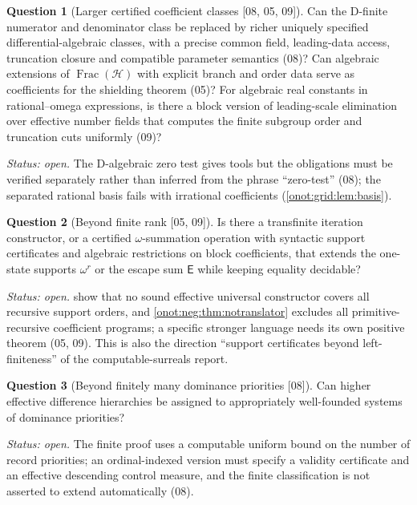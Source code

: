 \documentclass[11pt,oneside]{article}
\numberwithin{equation}{section}
\theoremstyle{definition}
\newtheorem{question}[question]{Question}
\theoremstyle{remark}
\newcommand{\FH}{\operatorname{Frac}(\mathcal H)}
\newcommand{\src}[1]{\textup{\textsf{\small[#1]}}}
\begin{document}
\begin{question}[Larger certified coefficient classes \src{08, 05, 09}]\label{onot:q:coefficients}
Can the D-finite numerator and denominator class be replaced by richer uniquely
specified differential-algebraic classes, with a precise common field, leading-data
access, truncation closure and compatible parameter semantics (08)? Can algebraic
extensions of $\FH$ with explicit branch and order data serve as coefficients for
the shielding theorem (05)? For algebraic real constants in rational--omega
expressions, is there a block version of leading-scale elimination over effective
number fields that computes the finite subgroup order and truncation cuts uniformly
(09)?
\end{question}
\emph{Status: open.} The D-algebraic zero test \cite{CFH} gives tools but the
obligations must be verified separately rather than inferred from the phrase
``zero-test'' (08); the separated rational basis fails with irrational coefficients
(\cref{onot:grid:lem:basis}).

\begin{question}[Beyond finite rank \src{05, 09}]\label{onot:q:beyond}
Is there a transfinite iteration constructor, or a certified $\omega$-summation
operation with syntactic support certificates and algebraic restrictions on block
coefficients, that extends the one-state supports $\omega^r$ or the escape sum
$\mathsf E$ while keeping equality decidable?
\end{question}
\emph{Status: open.}  show that no
sound effective universal constructor covers all recursive support orders, and
\cref{onot:neg:thm:notranslator} excludes all primitive-recursive coefficient
programs; a specific stronger language needs its own positive theorem (05, 09).
This is also the direction ``support certificates beyond left-finiteness'' of the
computable-surreals report.

\begin{question}[Beyond finitely many dominance priorities \src{08}]\label{onot:q:priorities}
Can higher effective difference hierarchies be assigned to appropriately
well-founded systems of dominance priorities?
\end{question}
\emph{Status: open.} The finite proof uses a computable uniform bound on the number
of record priorities; an ordinal-indexed version must specify a validity
certificate and an effective descending control measure, and the finite
classification is not asserted to extend automatically (08).
\end{document}
